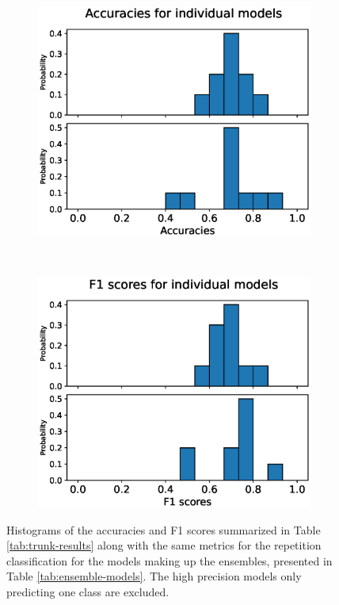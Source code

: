 \begin{figure}
  \begin{subfigure}[t]{0.4\textwidth}
    \includegraphics[width=\textwidth]{files/figs/res/trunk/acc-ind.eps}
    \caption{}
    \label{fig:trunk-acc-ind}
  \end{subfigure}
  ~
  \begin{subfigure}[t]{0.4\textwidth}
    \includegraphics[width=\textwidth]{files/figs/res/trunk/f1-ind.eps}
    \caption{}
    \label{fig:trunk-f1-ind}
  \end{subfigure}
  \caption{Histograms of the accuracies and F1 scores summarized in Table \ref{tab:trunk-results} along with the same metrics for the repetition classification for the models making up the ensembles, presented in Table \ref{tab:ensemble-models}. The high precision models only predicting one class are excluded.}
  \label{fig:trunk-hist-results}
\end{figure}

